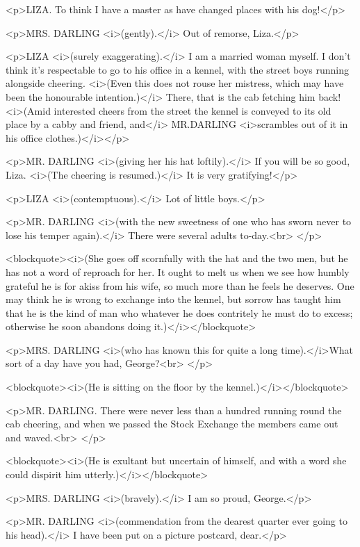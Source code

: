 <p>LIZA. To think I have a master as have changed places with his
dog!</p>

<p>MRS. DARLING <i>(gently).</i> Out of remorse, Liza.</p>

<p>LIZA <i>(surely exaggerating).</i> I am a married woman myself. I
don't think it's respectable to go to his office in a kennel, with
the street boys running alongside cheering. <i>(Even this does not
rouse her mistress, which may have been the honourable
intention.)</i> There, that is the cab fetching him back! <i>(Amid
interested cheers from the street the kennel is conveyed to its old
place by a cabby and friend, and</i> MR.DARLING <i>scrambles out of
it in his office clothes.)</i></p>

<p>MR. DARLING <i>(giving her his hat loftily).</i> If you will be so
good, Liza. <i>(The cheering is resumed.)</i> It is very
gratifying!</p>

<p>LIZA <i>(contemptuous).</i> Lot of little boys.</p>

<p>MR. DARLING <i>(with the new sweetness of one who has sworn never
to lose his temper again).</i> There were several adults to-day.<br>
</p>

<blockquote><i>(She goes off scornfully with the hat and the two men,
but he has not a word of reproach for her. It ought to melt us when
we see how humbly grateful he is for akiss from his wife, so much
more than he feels he deserves. One may think he is wrong to exchange
into the kennel, but sorrow has taught him that he is the kind of man
who whatever he does contritely he must do to excess; otherwise he
soon abandons doing it.)</i></blockquote>

<p>MRS. DARLING <i>(who has known this for quite a long
time).</i>What sort of a day have you had, George?<br>
</p>

<blockquote><i>(He is sitting on the floor by the
kennel.)</i></blockquote>

<p>MR. DARLING. There were never less than a hundred running round
the cab cheering, and when we passed the Stock Exchange the members
came out and waved.<br>
</p>

<blockquote><i>(He is exultant but uncertain of himself, and with a
word she could dispirit him utterly.)</i></blockquote>

<p>MRS. DARLING <i>(bravely).</i> I am so proud, George.</p>

<p>MR. DARLING <i>(commendation from the dearest quarter ever going
to his head).</i> I have been put on a picture postcard, dear.</p>

